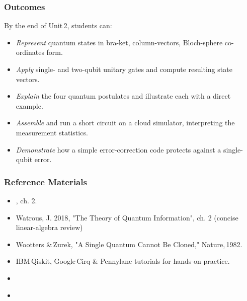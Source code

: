




\subsubsection{Outcomes}
By the end of Unit\,2, students can:
\begin{itemize}
	\item \emph{Represent} quantum states in bra-ket, column-vectors, Bloch-sphere co-ordinates form.
	\item \emph{Apply} single- and two-qubit unitary gates and compute resulting state vectors.
	\item \emph{Explain} the four quantum postulates and illustrate each with a direct example.
	\item \emph{Assemble} and run a short circuit on a cloud simulator, interpreting the measurement statistics.
	\item \emph{Demonstrate} how a simple error-correction code protects against a single-qubit error.	
\end{itemize}

\subsubsection{Reference Materials}
\begin{itemize}
	\item \citeauthor{Nielsen:2010} , ch. 2.
	\item Watrous, J. 2018, "The Theory of Quantum Information", ch. 2 (concise linear-algebra review)
	\item Wootters \&\,Zurek, "A Single Quantum Cannot Be Cloned," Nature,\,1982. %
	\item IBM\,Qiskit, Google\,Cirq \& Pennylane tutorials for hands-on practice.
	\item \citeauthor{Abhijith:2022} 
	\item \citeauthor{Ekert:1996} 
\end{itemize}

